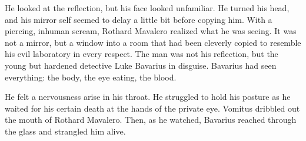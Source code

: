 He looked at the reflection, but his face looked unfamiliar. He
turned his head, and his mirror self seemed to delay a little bit
before copying him. With a piercing, inhuman scream, Rothard
Mavalero realized what he was seeing. It was not a mirror, but a
window into a room that had been cleverly copied to resemble his
evil laboratory in every respect. The man was not his reflection,
but the young but hardened detective Luke Bavarius in disguise.
Bavarius had seen everything: the body, the eye eating, the
blood.



He felt a nervousness arise in his throat. He struggled to hold his
posture as he waited for his certain death at the hands of the
private eye. Vomitus dribbled out the mouth of Rothard Mavalero.
Then, as he watched, Bavarius reached through the glass and
strangled him alive. 
 




